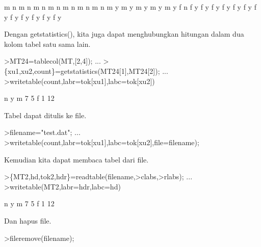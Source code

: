 \documentclass[a4paper,10pt]{article}
\begin{document}
\begin{eulernotebook}
\begin{euleroutput}
           m         n
           m         n
           m         n
           m         n
           m         n
           m         n
           m         n
           m         y
           m         y
           m         y
           m         y
           m         y
           f         n
           f         y
           f         y
           f         y
           f         y
           f         y
           f         y
           f         y
           f         y
           f         y
           f         y
           f         y
           f         y
\end{euleroutput}
\begin{eulercomment}
Dengan getstatistics(), kita juga dapat menghubungkan hitungan dalam
dua kolom tabel satu sama lain.
\end{eulercomment}
\begin{eulerprompt}
>MT24=tablecol(MT,[2,4]); ...
>\{xu1,xu2,count\}=getstatistics(MT24[1],MT24[2]); ...
>writetable(count,labr=tok[xu1],labc=tok[xu2])
\end{eulerprompt}
\begin{euleroutput}
                     n         y
           m         7         5
           f         1        12
\end{euleroutput}
\begin{eulercomment}
Tabel dapat ditulis ke file.
\end{eulercomment}
\begin{eulerprompt}
>filename="test.dat"; ...
>writetable(count,labr=tok[xu1],labc=tok[xu2],file=filename);
\end{eulerprompt}
\begin{eulercomment}
Kemudian kita dapat membaca tabel dari file.
\end{eulercomment}
\begin{eulerprompt}
>\{MT2,hd,tok2,hdr\}=readtable(filename,>clabs,>rlabs); ...
>writetable(MT2,labr=hdr,labc=hd)
\end{eulerprompt}
\begin{euleroutput}
                     n         y
           m         7         5
           f         1        12
\end{euleroutput}
\begin{eulercomment}
Dan hapus file.
\end{eulercomment}
\begin{eulerprompt}
>fileremove(filename);
\end{eulerprompt}
\begin{eulercomment}

\end{eulercomment}
\end{eulernotebook}
\end{document}
